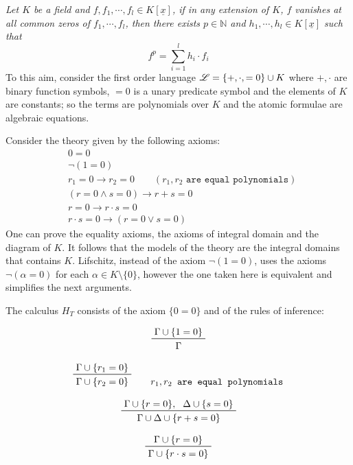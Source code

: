 \documentclass[a4paper,12pt,twoside]{book}
\let\o\vee
\let\e\wedge
\begin{document}
\noindent\textit{Let $K$ be a field and $f,f_1,\cdots, f_l \in K[\underline{x}]$, if in any extension of $K$, $f$ vanishes at all common zeros of $f_1,\cdots, f_l$, then there exists $p\in \mathbb{N}$ and $h_1,\cdots, h_l \in K[\underline{x}]$ such that} 
$$
f^p = \sum_{i=1}^l h_i \cdot f_i
$$
To this aim, consider the first order language $\mathscr{L}=\{+,\cdot,=\nobreak 0\}\cup\nobreak K$ where $+,\cdot$ are binary function symbols, $=0$ is a unary predicate symbol and the elements of $K$ are constants; so the terms are polynomials over $K$ and the atomic formulae are algebraic equations.

\noindent Consider the theory given by the following axioms:
\begin{eqnarray}
& 0=0  \label{ax00} \\
& \neg (1 =0) \\
& r_1=0 \rightarrow r_2 =0 \qquad (r_1,r_2 \texttt{ are equal polynomials}) \\
& ( r=0 \e s=0) \rightarrow r+s=0 \\
& r=0 \rightarrow r\cdot s=0 \\
& r\cdot s=0 \rightarrow (r=0 \o s=0) \label{axintdom}
\end{eqnarray}
One can prove the equality axioms, the axioms of integral domain and the diagram of $K$. It follows that the models of the theory are the integral domains that contains $K$. Lifschitz, instead of the axiom $\neg (1=0)$, uses the axioms  $\neg (\alpha =0)$ for each $\alpha\in K\setminus \{0\}$, however the one taken here is equivalent and simplifies the next arguments.  

The calculus $H_T$ consists of the axiom $\{0=0\}$ and of the rules of inference:

\begin{equation}\label{non1=0}
\prftree{\Gamma \cup \{1=0\}}{\Gamma}
\end{equation}

\begin{equation}\label{eqpoly}
\prftree{\Gamma \cup \{r_1=0\} } { \Gamma \cup \{r_2=0\} } \qquad r_1,r_2\texttt{ are equal polynomials}
\end{equation}

\begin{equation}\label{somm}
\prftree{\Gamma \cup \{r=0\},}{\Delta \cup \{s=0\}}{\Gamma \cup \Delta \cup \{r+s=0\} } 
\end{equation}

\begin{equation} \label{mol}
\prftree{\Gamma \cup \{r=0\}}{\Gamma \cup  \{r\cdot s=0\} } 
\end{equation}
\end{document}
